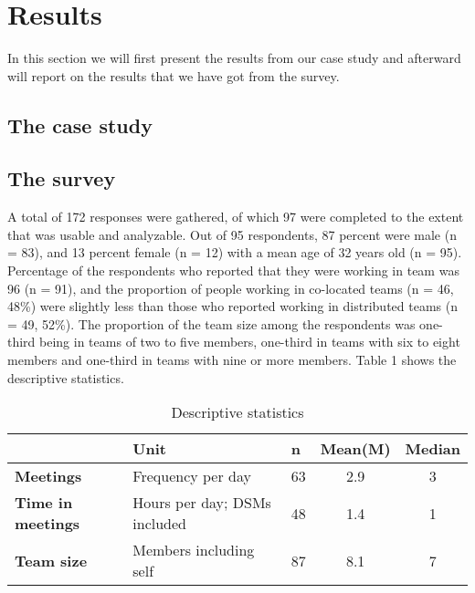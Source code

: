 \chapter{Results}
In this section we will first present the results from our case study and afterward will report on the results that we have got from the survey.

\section{The case study}


\section{The survey}
A total of 172 responses were gathered, of which 97 were completed to the extent that was usable and analyzable. Out of 95 respondents, 87 percent were male (n = 83), and 13 percent female (n = 12) with a mean age of 32 years old (n = 95). Percentage of the respondents who reported that they were working in team was 96 (n = 91), and the proportion of people working in co-located teams (n = 46, 48\%) were slightly less than those who reported working in distributed teams (n = 49, 52\%). The proportion of the team size among the respondents was one-third being in teams of two to five members, one-third in teams with six to eight members and one-third in teams with nine or more members. Table 1 shows the descriptive statistics. 



\begin{table}
\centering
\caption{Descriptive statistics} \label{table:ds}
\begin{tabular}{lllcc}
\hline
 & \textbf{Unit} & \textbf{n} & \textbf{Mean(M)} & \textbf{Median} \\ \hline
\textbf{Meetings} & Frequency per day & 63 & 2.9 & 3 \\
\textbf{Time in meetings} & Hours per day; DSMs included & 48 & 1.4 & 1 \\
\textbf{Team size} & Members including self & 87 & 8.1 & 7 \\
\hline
\end{tabular}
\end{table}